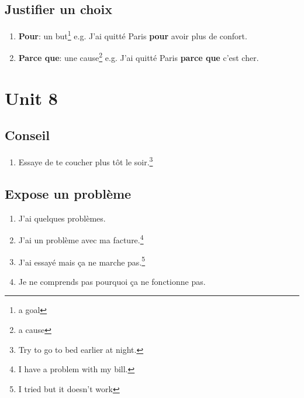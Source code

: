 \documentclass[math,code]{amznotes}
\theoremstyle{remark}
\begin{document}
\subsection*{Justifier un choix}
\begin{enumerate}
    \item \textbf{Pour}: un but\footnote{a goal} \newline
    e.g. J'ai quitté Paris \textbf{pour} avoir plus de confort.
    \item \textbf{Parce que}: une cause\footnote{a cause} \newline
    e.g. J'ai quitté Paris \textbf{parce que} c'est cher.
\end{enumerate}

\section*{Unit 8}
\subsection*{Conseil}
\begin{enumerate}
    \item Essaye de te coucher plus tôt le soir.\footnote{Try to go to bed earlier at night.}
\end{enumerate}

\subsection*{Expose un problème}
\begin{enumerate}
    \item J'ai quelques problèmes.
    \item J'ai un problème avec ma facture.\footnote{I have a problem with my bill.}
    \item J'ai essayé mais ça ne marche pas.\footnote{I tried but it doesn't work}
    \item Je ne comprends pas pourquoi ça ne fonctionne pas.
\end{enumerate}
\end{document}
